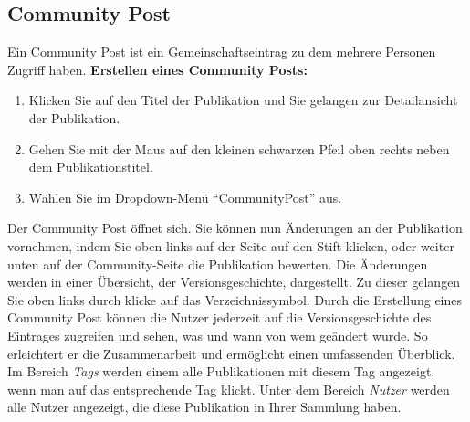 \subsection{Community Post}
Ein Community Post ist ein Gemeinschaftseintrag zu dem mehrere Personen Zugriff haben. \newline \newline
\textbf{Erstellen eines Community Posts:}
\begin{enumerate}
	\item Klicken Sie auf den Titel der Publikation und Sie gelangen zur Detailansicht der Publikation. 
	\item Gehen Sie mit der Maus auf den kleinen schwarzen Pfeil oben rechts neben dem Publikationstitel. 
	\item Wählen Sie im Dropdown-Menü \enquote{CommunityPost} aus. \end{enumerate}
Der Community Post öffnet sich. Sie können nun Änderungen an der Publikation vornehmen, indem Sie oben links auf der Seite auf den Stift klicken, oder weiter unten auf der Community-Seite die Publikation bewerten. Die Änderungen werden in einer Übersicht, der Versionsgeschichte, dargestellt. Zu dieser gelangen Sie oben links durch klicke auf das Verzeichnissymbol.\newline
Durch die Erstellung eines Community Post können die Nutzer jederzeit auf die Versionsgeschichte des Eintrages zugreifen und sehen, was und wann von wem geändert wurde. So erleichtert er die Zusammenarbeit und ermöglicht einen umfassenden Überblick. \newline
Im Bereich \textit{Tags} werden einem alle Publikationen mit diesem Tag angezeigt, wenn man auf das entsprechende Tag klickt. \newline
Unter dem Bereich \textit{Nutzer} werden alle Nutzer angezeigt, die diese Publikation in Ihrer Sammlung haben.







